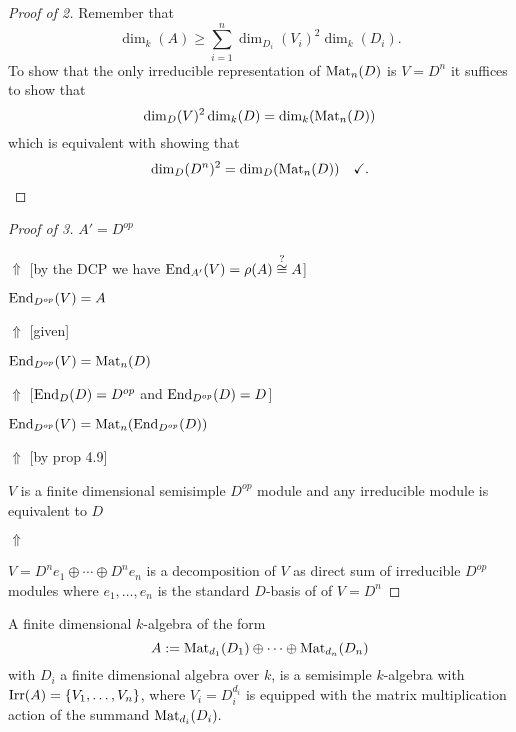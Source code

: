 \begin{proof}[Proof of 2]
Remember that
\[
\dim_{k}(A)\geq \sum _{i=1}^n\dim_{D_{i}}(V_{i})^2\dim_{k}(D_{i}).
\]
To show that the only irreducible representation of \(\operatorname{Mat}_{n}(D)\) is \(V=D^n\) it suffices to show that
\[
\dim_{D}(V)^2\dim_{k}(D)=\dim_{k}(\operatorname{Mat}_{n}(D))
\]
which is equivalent with showing that
\[
\dim_{D}(D^n)^2=\dim_D(\operatorname{Mat}_{n}(D)) \quad \checkmark.
\]
\end{proof}

\begin{proof}[Proof of 3]
\(A'=D^{op}\)

\(\Uparrow \) [by the DCP we have \(\operatorname{End}_{A'}(V)=\rho (A)\overset{?}{\cong }A\)]

\(\operatorname{End}_{D^{op}}(V)=A\)

\(\Uparrow \) [given]

\(\operatorname{End}_{D^{op}}(V)=\operatorname{Mat}_{n}(D)\)

\(\Uparrow \) [\(\operatorname{End}_D(D)=D^{op}\) and \(\operatorname{End}_{D^{op}}(D)=D\)]

\(\operatorname{End}_{D^{op}}(V)=\operatorname{Mat}_{n}(\operatorname{End}_{D^{op}}(D))\)

\(\Uparrow \) [by prop 4.9]

\(V\) is a finite dimensional semisimple \(D^{op}\) module and any irreducible  module is equivalent to \(D\)

\(\Uparrow \)

\(V=D^ne_{1}\oplus \cdots \oplus D^ne_{n}\) is a decomposition of \(V\) as direct sum of irreducible \(D^{op}\) modules where \({e_{1},\ldots ,e_{n}}\) is the standard \(D\)-basis of of \(V=D^n\)
\end{proof}

\begin{prop}
A finite dimensional \(k\)-algebra of the form
\[
A:=\operatorname{Mat}_{d_{1}}(D_{1})\oplus \cdots \oplus \operatorname{Mat}_{d_{n}}(D_{n})
\]
with \(D_{i}\) a finite dimensional algebra over \(k\), is a semisimple \(k\)-algebra
with \(\operatorname{Irr}(A)=\{V_{1},\ldots ,V_{n}\}\), where \(V_{i}=D_{i}^{d_{i}}\) is equipped with the matrix multiplication action of the summand \(\operatorname{Mat}_{d_{i}}(D_{i}).\)
\end{prop}

